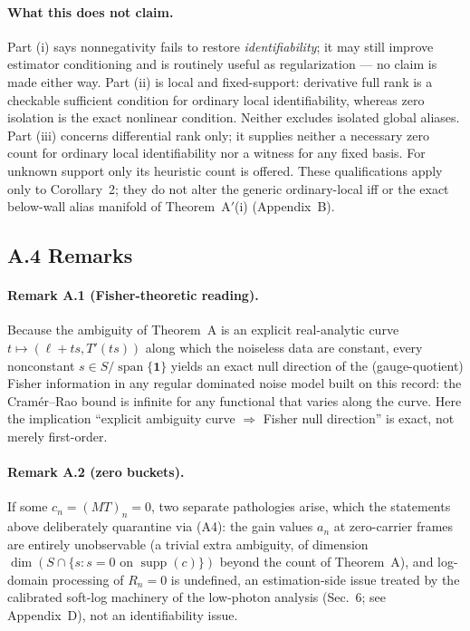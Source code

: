 \paragraph{What this does not claim.} Part (i) says nonnegativity fails to restore \emph{identifiability}; it may still improve estimator conditioning and is routinely useful as regularization --- no claim is made either way. Part (ii) is local and fixed-support: derivative full rank is a checkable sufficient condition for ordinary local identifiability, whereas zero isolation is the exact nonlinear condition. Neither excludes isolated global aliases. Part (iii) concerns differential rank only; it supplies neither a necessary zero count for ordinary local identifiability nor a witness for any fixed basis. For unknown support only its heuristic count is offered. These qualifications apply only to Corollary~2; they do not alter the generic ordinary-local iff or the exact below-wall alias manifold of Theorem~A$'$(i) (Appendix~B).

\subsection{A.4 Remarks}

\paragraph{Remark A.1 (Fisher-theoretic reading).} Because the ambiguity of Theorem~A is an explicit real-analytic curve $t \mapsto (\ell + ts, T'(ts))$ along which the noiseless data are constant, every nonconstant $s \in S/\operatorname{span}\{\mathbf 1\}$ yields an exact null direction of the (gauge-quotient) Fisher information in any regular dominated noise model built on this record: the Cram\'er--Rao bound is infinite for any functional that varies along the curve. Here the implication ``explicit ambiguity curve $\Rightarrow$ Fisher null direction'' is exact, not merely first-order.

\paragraph{Remark A.2 (zero buckets).} If some $c_n = (MT)_n = 0$, two separate pathologies arise, which the statements above deliberately quarantine via (A4): the gain values $a_n$ at zero-carrier frames are entirely unobservable (a trivial extra ambiguity, of dimension $\dim(S \cap \{s : s = 0 \text{ on } \operatorname{supp}(c)\})$ beyond the count of Theorem~A), and log-domain processing of $R_n = 0$ is undefined, an estimation-side issue treated by the calibrated soft-log machinery of the low-photon analysis (Sec.~6; see Appendix~D), not an identifiability issue.


